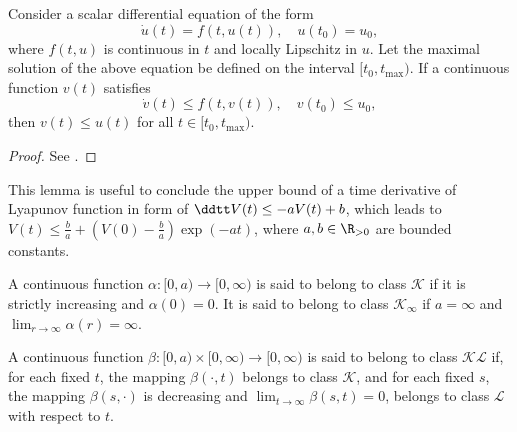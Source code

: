 \begin{lem} \label{appx:lem:comparison}
    Consider a scalar differential equation of the form
    \begin{equation}
        \dot{u}(t) = f(t,u(t)), \quad u(t_0) = u_0
        ,
    \end{equation}
    where $f(t,u)$ is continuous in $t$ and locally Lipschitz in $u$. 
    Let the maximal solution of the above equation be defined on the interval $[t_0, t_{\max})$. 
    If a continuous function $v(t)$ satisfies 
    \begin{equation}
        \dot{v}(t) \leq f(t,v(t)), \quad v(t_0) \leq u_0
        ,
    \end{equation}
    then $v(t) \leq u(t)$ for all $t \in [t_0, t_{\max})$.
\end{lem}

\begin{proof}
    See \cite[pp. 689--660]{Khalil:2002aa}.
\end{proof}

This lemma is useful to conclude the upper bound of a time derivative of Lyapunov function in form of $\ddtt V(t) \le -a V(t) + b$, which leads to $V(t) \le \frac{b}{a} + (V(0) - \frac{b}{a}) \exp(-at)$, where $a,b \in \R_{>0}$ are bounded constants.

\begin{definition} \label{appx:def:class:K}
    A continuous function $\alpha: [0,a) \rightarrow [0,\infty)$ is said to belong to class $\mathcal{K}$ if it is strictly increasing and $\alpha(0) = 0$.
    It is said to belong to class $\mathcal{K}_\infty$ if $a = \infty$ and $\lim_{r \rightarrow \infty} \alpha(r) = \infty$.
\end{definition}

\begin{definition} \label{appx:def:class:KL}
    A continuous function $\beta: [0,a) \times [0,\infty) \rightarrow [0,\infty)$ is said to belong to class $\mathcal{KL}$ if, for each fixed $t$, the mapping $\beta(\cdot,t)$ belongs to class $\mathcal{K}$, and for each fixed $s$, the mapping $\beta(s,\cdot)$ is decreasing and $\lim_{t \rightarrow \infty} \beta(s,t) = 0$, \ie belongs to class $\mathcal{L}$ with respect to $t$.
\end{definition}


